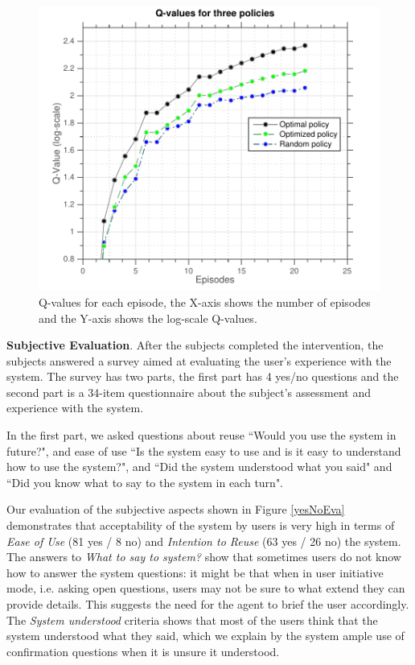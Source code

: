 \documentclass[letterpaper]{article}
\begin{document}
 \begin{figure}
 \centering
 \includegraphics[width=\columnwidth]{figures/q-values.pdf}
 \caption{Q-values for each episode, the X-axis shows the number of episodes and the Y-axis shows the log-scale Q-values.}
 \label{q-values}
 \end{figure}


{\bf Subjective Evaluation}. After the subjects completed the intervention, the subjects answered a survey aimed at evaluating the user's experience with the system. The survey has two parts, the first part has 4 yes/no questions and the second part is a 34-item questionnaire about the subject's assessment and experience with the system. 

In the first part, we asked questions about reuse ``Would you use the system in future?", and ease of use ``Is the system easy to use and is it easy to understand how to use the system?", and ``Did the system understood what you said" and ``Did you know what to say to the system in each turn".

Our evaluation of the subjective aspects shown in Figure \ref{yesNoEva} demonstrates that acceptability of the system by users is very high in terms of {\em Ease of Use} (81 yes / 8 no) and {\em Intention to Reuse} (63 yes / 26 no)
the system. The answers to {\em What to say to system?} show that sometimes users do not know how to answer the system questions: it might be that when in user initiative mode, i.e. asking open questions, users may not be sure to what extend they can provide details. This suggests the need for the agent to brief the user accordingly.
The {\em System understood} criteria shows that most of the users think that the system understood what they said, which we explain by the system ample use of confirmation questions when it is unsure it understood. 
\end{document}
